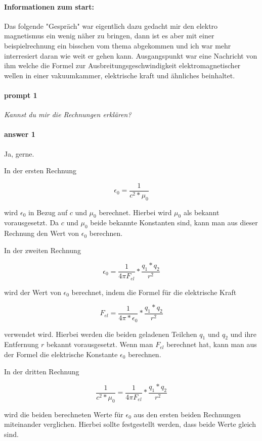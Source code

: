 \documentclass{article}
\begin{document}
\paragraph{Informationen zum start:}
Das folgende "Gespräch" war eigentlich dazu gedacht mir den elektro magnetismus
ein wenig näher zu bringen, dann ist es aber mit einer beispielrechnung ein
bisschen vom thema abgekommen und ich war mehr interresiert daran wie weit er
gehen kann. Ausgangspunkt war eine Nachricht von ihm welche die Formel zur
Ausbreitungsgeschwindigkeit elektromagnetischer wellen in einer vakuumkammer,
elektrische kraft und ähnliches beinhaltet.
\paragraph{prompt 1} %
\label{par:prompt 1}
\textit{Kannst du mir die Rechnungen erklären?}

\paragraph{answer 1} %
\label{par:answer 1}
Ja, gerne.

In der ersten Rechnung

$$\epsilon_0 = \frac{1}{c^2 * \mu_0}$$

wird $\epsilon_0$ in Bezug auf $c$ und $\mu_0$ berechnet. Hierbei wird $\mu_0$
als bekannt vorausgesetzt. Da $c$ und $\mu_0$ beide bekannte Konstanten sind,
kann man aus dieser Rechnung den Wert von $\epsilon_0$ berechnen.

In der zweiten Rechnung

$$\epsilon_0 = \frac{1}{4\pi F_{el}} * \frac{q_1 * q_2}{r^2}$$

wird der Wert von $\epsilon_0$ berechnet, indem die Formel für die elektrische Kraft

$$F_{el} = \frac{1}{4\pi * \epsilon_0} * \frac{q_1 * q_2}{r^2}$$

verwendet wird. Hierbei werden die beiden geladenen Teilchen $q_1$ und $q_2$
und ihre Entfernung $r$ bekannt vorausgesetzt. Wenn man $F_{el}$ berechnet hat,
kann man aus der Formel die elektrische Konstante $\epsilon_0$ berechnen.

In der dritten Rechnung

$$\frac{1}{c^2 * \mu_0} = \frac{1}{4\pi F_{el}} * \frac{q_1 * q_2}{r^2}$$

wird die beiden berechneten Werte für $\epsilon_0$ aus den ersten beiden
Rechnungen miteinander verglichen. Hierbei sollte festgestellt werden, dass
beide Werte gleich sind.
\end{document}
